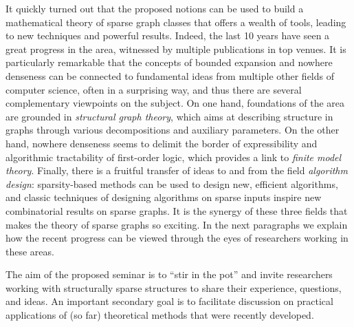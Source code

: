 It quickly turned out that the proposed notions can be used to build a mathematical theory of sparse graph classes that offers a wealth of tools, leading to new techniques and powerful results.
Indeed, the last 10 years have seen a great progress in the area, witnessed by multiple publications in top venues.
It is particularly remarkable that the concepts of bounded expansion and nowhere denseness can be connected
to fundamental ideas from multiple other fields of computer science, often in a surprising way, and thus there are several complementary viewpoints on the subject.
On one hand, foundations of the area are grounded in {\em{structural graph theory}}, which aims at describing structure in graphs through various decompositions and auxiliary parameters.
On the other hand, nowhere denseness seems to delimit the border of expressibility and algorithmic tractability of first-order logic, which provides a link to {\em{finite model theory}}.
Finally, there is a fruitful transfer of ideas to and from the field {\em{algorithm design}}: sparsity-based methods can be used to design new, efficient algorithms,
and classic techniques of designing algorithms on sparse inputs inspire new combinatorial results on sparse graphs.
It is the synergy of these three fields that makes the theory of sparse graphs so exciting.
In the next paragraphs we explain how the recent progress can be viewed through the eyes of researchers working in these areas.

The aim of the proposed seminar is to ``stir in the pot'' and invite researchers working with structurally sparse structures to share their experience, questions, and ideas.
An important secondary goal is to facilitate discussion on practical applications of (so far) theoretical methods that were recently developed.
